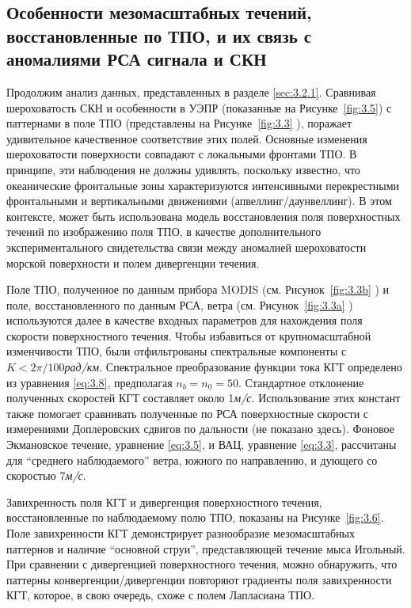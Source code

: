 {\subsection{Особенности мезомасштабных течений, восстановленные по ТПО, и их связь с аномалиями РСА сигнала и СКН} \label{sec:3.2.3}
 

Продолжим анализ данных, представленных в разделе \ref{sec:3.2.1}. Сравнивая шероховатость СКН и особенности в УЭПР (показанные на Рисунке~\ref{fig:3.5}) с паттернами в поле ТПО (представлены на Рисунке~\ref{fig:3.3} ), поражает удивительное качественное соответствие этих полей. Основные изменения шероховатости поверхности совпадают с локальными фронтами ТПО. В принципе, эти наблюдения не должны удивлять, поскольку известно, что океанические фронтальные зоны характеризуются интенсивными перекрестными фронтальными и вертикальными движениями (апвеллинг/даунвеллинг). В этом контексте, может быть использована модель восстановления поля поверхностных течений по изображению поля ТПО, в качестве дополнительного экспериментального свидетельства связи между аномалией шероховатости морской поверхности и полем дивергенции течения.

Поле ТПО, полученное по данным прибора MODIS (см. Рисунок~\ref{fig:3.3b} ) и поле, восстановленного по данным РСА, ветра (см. Рисунок~\ref{fig:3.3a} ) используются далее в качестве входных параметров для нахождения поля скорости поверхностного течения. Чтобы избавиться от крупномасштабной изменчивости ТПО, были отфильтрованы спектральные компоненты с $K<2\pi /100$\textit{рад/км}. Спектральное преобразование функции тока КГТ определено из уравнения \eqref{eq:3.8}, предполагая $n_{b} =n_{0} =50$. Стандартное отклонение полученных скоростей КГТ составляет около 1\textit{м/с}. Использование этих констант также помогает сравнивать полученные по РСА поверхностные скорости \citep{Chapron2005, Johannessen2008} с измерениями Доплеровских сдвигов по дальности (не показано здесь). Фоновое Экмановское течение, уравнение \eqref{eq:3.5}, и ВАЦ, уравнение \eqref{eq:3.3}, рассчитаны для ``среднего наблюдаемого'' ветра, южного по направлению, и дующего со скоростью 7\textit{м/с}.

Завихренность поля КГТ и дивергенция поверхностного течения, восстановленные по наблюдаемому полю ТПО, показаны на Рисунке~\ref{fig:3.6}. Поле завихренности КГТ демонстрирует разнообразие мезомасштабных паттернов и наличие ``основной струи'', представляющей течение мыса Игольный. При сравнении с дивергенцией поверхностного течения, можно обнаружить, что паттерны конвергенции/дивергенции повторяют градиенты поля завихренности КГТ, которое, в свою очередь, схоже с полем Лапласиана ТПО.



}
